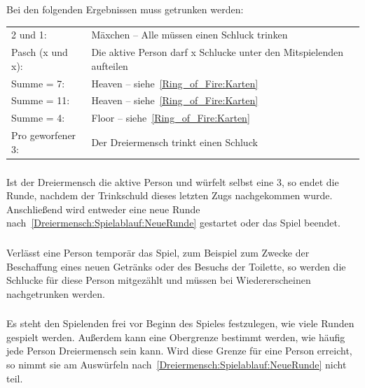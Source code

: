 \subsubsection{}
Bei den folgenden Ergebnissen muss getrunken werden:

\begin{tabular}{p{8em} p{22em}}
	2 und 1:          & Mäxchen – Alle müssen einen Schluck trinken                         \\
	Pasch (x und x):  & Die aktive Person darf x Schlucke unter den Mitspielenden aufteilen \\
	Summe = 7:        & Heaven – siehe~\ref{Ring_of_Fire:Karten}                            \\
	Summe = 11:       & Heaven – siehe~\ref{Ring_of_Fire:Karten}                            \\
	Summe = 4:        & Floor – siehe~\ref{Ring_of_Fire:Karten}                             \\
	Pro geworfener 3: & Der Dreiermensch trinkt einen Schluck
\end{tabular}

\subsubsection{}
Ist der Dreiermensch die aktive Person und würfelt selbst eine 3, so endet die Runde, nachdem der Trinkschuld dieses letzten Zugs nachgekommen wurde.
Anschließend wird entweder eine neue Runde nach~\ref{Dreiermensch:Spielablauf:NeueRunde} gestartet oder das Spiel beendet.

\subsubsection{}
Verlässt eine Person temporär das Spiel, zum Beispiel zum Zwecke der Beschaffung eines neuen Getränks oder des Besuchs der Toilette, so werden die Schlucke für diese Person mitgezählt und müssen bei Wiedererscheinen nachgetrunken werden.

\subsubsection{}
Es steht den Spielenden frei vor Beginn des Spieles festzulegen, wie viele Runden gespielt werden.
Außerdem kann eine Obergrenze bestimmt werden, wie häufig jede Person Dreiermensch sein kann.
Wird diese Grenze für eine Person erreicht, so nimmt sie am Auswürfeln nach~\ref{Dreiermensch:Spielablauf:NeueRunde} nicht teil.
